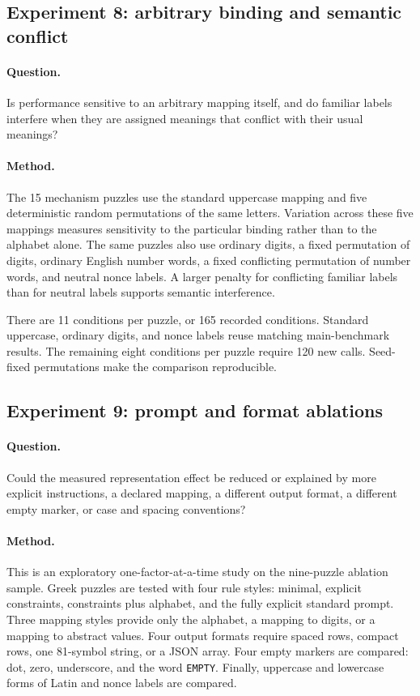 \documentclass[11pt,a4paper]{article}
\begin{document}
\subsection{Experiment 8: arbitrary binding and semantic conflict}
\paragraph{Question.}
Is performance sensitive to an arbitrary mapping itself, and do familiar labels interfere when they are assigned meanings that conflict with their usual meanings?

\paragraph{Method.}
The 15 mechanism puzzles use the standard uppercase mapping and five deterministic random permutations of the same letters.  Variation across these five mappings measures sensitivity to the particular binding rather than to the alphabet alone.  The same puzzles also use ordinary digits, a fixed permutation of digits, ordinary English number words, a fixed conflicting permutation of number words, and neutral nonce labels.  A larger penalty for conflicting familiar labels than for neutral labels supports semantic interference.

There are 11 conditions per puzzle, or 165 recorded conditions.  Standard uppercase, ordinary digits, and nonce labels reuse matching main-benchmark results.  The remaining eight conditions per puzzle require 120 new calls.  Seed-fixed permutations make the comparison reproducible.

\subsection{Experiment 9: prompt and format ablations}
\paragraph{Question.}
Could the measured representation effect be reduced or explained by more explicit instructions, a declared mapping, a different output format, a different empty marker, or case and spacing conventions?

\paragraph{Method.}
This is an exploratory one-factor-at-a-time study on the nine-puzzle ablation sample.  Greek puzzles are tested with four rule styles: minimal, explicit constraints, constraints plus alphabet, and the fully explicit standard prompt.  Three mapping styles provide only the alphabet, a mapping to digits, or a mapping to abstract values.  Four output formats require spaced rows, compact rows, one 81-symbol string, or a JSON array.  Four empty markers are compared: dot, zero, underscore, and the word \texttt{EMPTY}.  Finally, uppercase and lowercase forms of Latin and nonce labels are compared.
\end{document}
